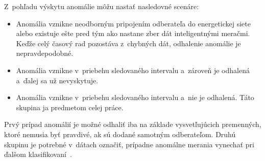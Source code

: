 \documentclass[a4paper,twoside,slovak,12pt,appendix]{article}
\begin{document}
Z~pohľadu výskytu anomálie môžu nastať nasledovné scenáre:
\begin{itemize}
  \item Anomália vznikne neodborným pripojením odberateľa do energetickej siete alebo existuje ešte pred tým ako nastane zber dát inteligentnými meračmi.
        Keďže celý časový rad pozostáva z~chybných dát, odhalenie anomálie je nepravdepodobné.
  \item Anomália vznikne v~priebehu sledovaného intervalu a~zároveň je odhalená a~ďalej sa už nevyskytuje.
  \item Anomália vznikne v~priebehu sledovaného intervalu a~nie je odhalená. Táto skupina ja predmetom celej práce.
\end{itemize}
Prvý prípad anomálií je možné odhaliť iba na základe vysvetľujúcich premenných,
ktoré nemusia byť pravdivé, ak sú dodané samotným odberateľom. Druhú skupinu je
potrebné v~dátach označiť, prípadne anomálne merania vynechať pri ďalšom
klasifikovaní~\cite{Spiric2015}.


\end{document}
